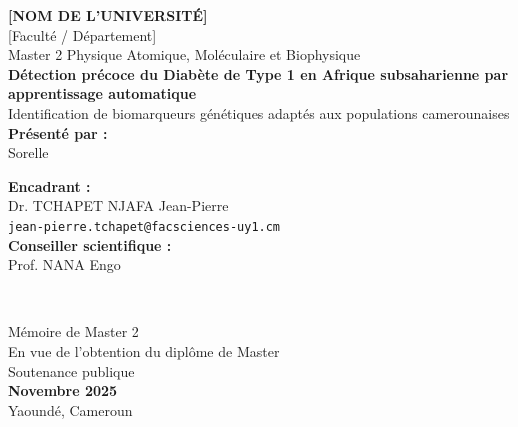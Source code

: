\begin{titlepage}
    \centering


    {\Large \textbf{[NOM DE L'UNIVERSITÉ]}}\\[0.5cm]
    {\large [Faculté / Département]}\\[0.3cm]
    {\large Master 2 Physique Atomique, Moléculaire et Biophysique}\\[2cm]

    {\huge \textbf{Détection précoce du Diabète de Type 1 en Afrique subsaharienne par apprentissage automatique}}\\[0.5cm]

    {\LARGE Identification de biomarqueurs génétiques adaptés aux populations camerounaises}\\[3cm]

    {\Large \textbf{Présenté par :}}\\[0.3cm]
    {\Large Sorelle}\\[2cm]

    \begin{minipage}{0.8\textwidth}
        \begin{flushleft}
            {\large \textbf{Encadrant :}}\\
            {\large Dr. TCHAPET NJAFA Jean-Pierre}\\
            {\small \texttt{jean-pierre.tchapet@facsciences-uy1.cm}}\\[0.5cm]

            {\large \textbf{Conseiller scientifique :}}\\
            {\large Prof. NANA Engo}
        \end{flushleft}
    \end{minipage}\\[2cm]

    \vfill

    {\large Mémoire de Master 2}\\[0.2cm]
    {\large En vue de l'obtention du diplôme de Master}\\[0.2cm]
    {\large Soutenance publique}\\[1cm]

    {\Large \textbf{Novembre 2025}}\\[0.5cm]

    {\large Yaoundé, Cameroun}

\end{titlepage}
